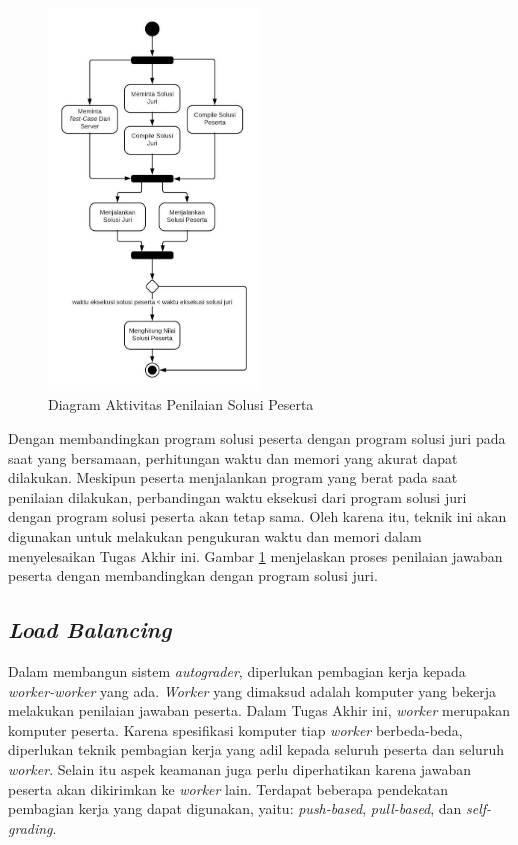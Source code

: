 \begin{figure}
    \centering
    \includegraphics[width=0.5\textwidth]{images/cpu-time-counting}
    \caption{Diagram Aktivitas Penilaian Solusi Peserta}
    \label{fig:cpu-time-counting}
\end{figure}

\par Dengan membandingkan program solusi peserta dengan program solusi juri pada saat yang bersamaan, perhitungan waktu dan memori yang akurat dapat dilakukan. Meskipun peserta menjalankan program yang berat pada saat penilaian dilakukan, perbandingan waktu eksekusi dari program solusi juri dengan program solusi peserta akan tetap sama. Oleh karena itu, teknik ini akan digunakan untuk melakukan pengukuran waktu dan memori dalam menyelesaikan Tugas Akhir ini. Gambar \ref{fig:cpu-time-counting} menjelaskan proses penilaian jawaban peserta dengan membandingkan dengan program solusi juri. 

\subsection{\textit{Load Balancing}}

\par Dalam membangun sistem \textit{autograder}, diperlukan pembagian kerja kepada \textit{worker-worker} yang ada. \textit{Worker} yang dimaksud adalah komputer yang bekerja melakukan penilaian jawaban peserta. Dalam Tugas Akhir ini, \textit{worker} merupakan komputer peserta. Karena spesifikasi komputer tiap \textit{worker} berbeda-beda, diperlukan teknik pembagian kerja yang adil kepada seluruh peserta dan seluruh \textit{worker}. Selain itu aspek keamanan juga perlu diperhatikan karena jawaban peserta akan dikirimkan ke \textit{worker} lain. Terdapat beberapa pendekatan pembagian kerja yang dapat digunakan, yaitu: \textit{push-based}, \textit{pull-based}, dan \textit{self-grading}.

